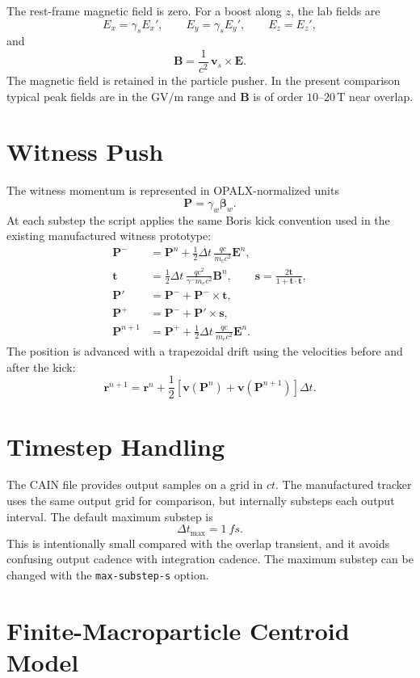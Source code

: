 \documentclass[11pt]{article}
\newcommand{\vect}[1]{\boldsymbol{#1}}
\newcommand{\E}{\vect{E}}
\newcommand{\B}{\vect{B}}
\newcommand{\Pmom}{\vect{P}}
\newcommand{\betav}{\boldsymbol{\beta}}
\begin{document}
The rest-frame magnetic field is zero.  For a boost along \(z\), the lab fields
are
\[
  E_x = \gamma_s E_x',\qquad
  E_y = \gamma_s E_y',\qquad
  E_z = E_z',
\]
and
\[
  \B = \frac{1}{c^2}\,\vect v_s \times \E .
\]
The magnetic field is retained in the particle pusher.  In the present
comparison typical peak fields are in the \(\mathrm{GV/m}\) range and
\(\B\) is of order \(10\)--\(20\,\mathrm{T}\) near overlap.

\section{Witness Push}

The witness momentum is represented in OPALX-normalized units
\[
  \Pmom = \gamma_w \betav_w.
\]
At each substep the script applies the same Boris kick convention used in the
existing manufactured witness prototype:
\begin{align}
  \Pmom^- &=
    \Pmom^n
    + \frac{1}{2}\Delta t\,
      \frac{q c}{m_e c^2}\E^n, \\
  \vect t &=
    \frac{1}{2}\Delta t\,
    \frac{q c^2}{\gamma^- m_e c^2}\B^n,
  \qquad
  \vect s =
    \frac{2\vect t}{1+\vect t\cdot\vect t}, \\
  \Pmom' &= \Pmom^- + \Pmom^- \times \vect t, \\
  \Pmom^+ &= \Pmom^- + \Pmom' \times \vect s, \\
  \Pmom^{n+1} &=
    \Pmom^+
    + \frac{1}{2}\Delta t\,
      \frac{q c}{m_e c^2}\E^n .
\end{align}
The position is advanced with a trapezoidal drift using the velocities before
and after the kick:
\[
  \vect r^{n+1}
  =
  \vect r^n
  +
  \frac{1}{2}
  \left[
    \vect v(\Pmom^n) + \vect v(\Pmom^{n+1})
  \right]\Delta t .
\]

\section{Timestep Handling}

The CAIN file provides output samples on a grid in \(ct\).  The manufactured
tracker uses the same output grid for comparison, but internally substeps each
output interval.  The default maximum substep is
\[
  \Delta t_{\max} = \SI{1}{fs}.
\]
This is intentionally small compared with the overlap transient, and it avoids
confusing output cadence with integration cadence.  The maximum substep can be
changed with the \texttt{max-substep-s} option.

\section{Finite-Macroparticle Centroid Model}
\end{document}
